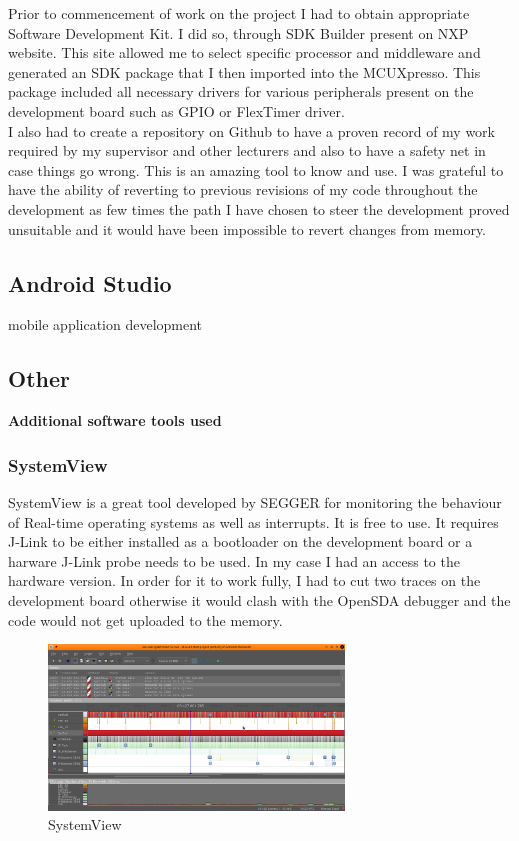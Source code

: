 \documentclass[12pt,a4paper]{article}
\begin{document}
		Prior to commencement of work on the project I had to obtain appropriate Software
		Development Kit. I did so, through SDK Builder present on NXP website. This site allowed 
		me to select specific processor and middleware and generated an SDK package that I then 
		imported into the MCUXpresso. This package included all necessary drivers for various 
		peripherals present on the development board such as GPIO or FlexTimer driver.\\
		
		I also had to create a repository on Github to have a proven record of my work required 
		by my supervisor and other lecturers and also to have a safety net in case things go 
		wrong. This is an amazing tool to know and use. I was grateful to have the ability of 
		reverting to previous revisions of my code throughout the development as few times the  
		path I have chosen to steer the development proved unsuitable and it would have been  
		impossible to revert changes from memory.
		\newpage
	
		\subsection{Android Studio}
		mobile application development
		\newpage
		
		\subsection{Other}
		{\bfseries Additional software tools used}
		
		\subsubsection{SystemView}
		SystemView is a great tool developed by SEGGER for monitoring the behaviour of Real-time
		operating systems as well as interrupts. It is free to use. It requires J-Link to be either installed as a bootloader on the development board or a harware J-Link probe needs to be used. In my case I had an access to the hardware version. In order for it to work fully, I had to cut two traces on the development board otherwise it would clash with the OpenSDA debugger and the code would not get uploaded to the memory.
				
		\begin{figure}[h]
			\centering
			\includegraphics[width=0.7\textwidth]{systemview1}
			\caption{SystemView}
		\end{figure}
	
\end{document}
